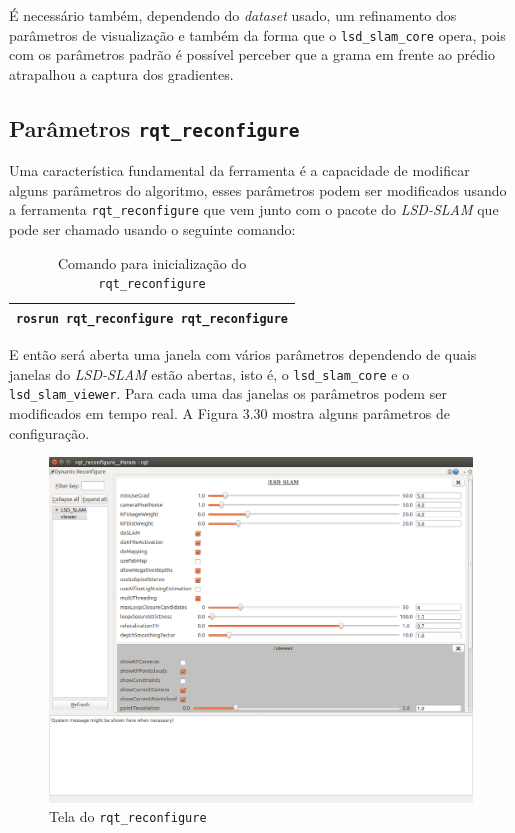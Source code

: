 É necessário também, dependendo do \textit{dataset} usado, um refinamento dos parâmetros de visualização e também da forma que o \texttt{lsd\_slam\_core} opera, pois com os parâmetros padrão é possível perceber que a grama em frente ao prédio atrapalhou a captura dos gradientes.

\subsection{Parâmetros \texttt{rqt\_reconfigure}}

Uma característica fundamental da ferramenta é a capacidade de modificar alguns parâmetros do algoritmo, esses parâmetros podem ser modificados usando a ferramenta \texttt{rqt\_reconfigure} que vem junto com o pacote do \textit{LSD-SLAM} que pode ser chamado usando o seguinte comando:

\begin{table}[H]\label{tb:17}
\begin{tabular}{| p{\textwidth}|}
\hline
\texttt{rosrun rqt\_reconfigure rqt\_reconfigure}\\
\hline
\end{tabular}
\caption{Comando para inicialização do \texttt{rqt\_reconfigure}}
\end{table}

E então será aberta uma janela com vários parâmetros dependendo de quais janelas do \textit{LSD-SLAM} estão abertas, isto é, o \texttt{lsd\_slam\_core} e o \texttt{lsd\_slam\_viewer}. Para cada uma das janelas os parâmetros podem ser modificados em tempo real. A Figura 3.30 mostra alguns parâmetros de configuração.

\begin{figure}[H]
	\centering
		\includegraphics[width= \textwidth]{Imagens/figura3-30.png}
	\caption{Tela do \texttt{rqt\_reconfigure}}
	\label{fig3:28}
\end{figure}



